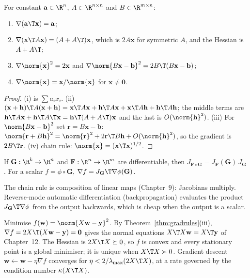 \begin{theorem}\label{thm:gradrules}
For constant $\mathbf{a}\in\R^n$, $A\in\R^{n\times n}$ and $B\in\R^{m\times n}$:
\begin{enumerate}[label=(\roman*)]
  \item $\nabla(\mathbf{a}\T\mathbf{x})=\mathbf{a}$;
  \item $\nabla(\mathbf{x}\T A\mathbf{x})=(A+A\T)\mathbf{x}$, which is $2A\mathbf{x}$ for symmetric $A$, and the Hessian is $A+A\T$;
  \item $\nabla\norm{\mathbf{x}}^2=2\mathbf{x}$ and $\nabla\norm{B\mathbf{x}-\mathbf{b}}^2=2B\T(B\mathbf{x}-\mathbf{b})$;
  \item $\nabla\norm{\mathbf{x}}=\mathbf{x}/\norm{\mathbf{x}}$ for $\mathbf{x}\ne\mathbf{0}$.
\end{enumerate}
\end{theorem}

\begin{proof}
(i) is $\sum a_ix_i$. (ii) $(\mathbf{x}+\mathbf{h})\T A(\mathbf{x}+\mathbf{h})=\mathbf{x}\T A\mathbf{x}+\mathbf{h}\T A\mathbf{x}+\mathbf{x}\T A\mathbf{h}+\mathbf{h}\T A\mathbf{h}$; the middle terms are $\mathbf{h}\T A\mathbf{x}+\mathbf{h}\T A\T\mathbf{x}=\mathbf{h}\T(A+A\T)\mathbf{x}$ and the last is $O(\norm{\mathbf{h}}^2)$. (iii) For $\norm{B\mathbf{x}-\mathbf{b}}^2$ set $\mathbf{r}=B\mathbf{x}-\mathbf{b}$: $\norm{\mathbf{r}+B\mathbf{h}}^2=\norm{\mathbf{r}}^2+2\mathbf{r}\T B\mathbf{h}+O(\norm{\mathbf{h}}^2)$, so the gradient is $2B\T\mathbf{r}$. (iv) chain rule: $\norm{\mathbf{x}}=(\mathbf{x}\T\mathbf{x})^{1/2}$.
\end{proof}

\begin{theorem}\label{thm:chainrule}
If $\mathbf{G}:\R^k\to\R^n$ and $\mathbf{F}:\R^n\to\R^m$ are differentiable, then $J_{\mathbf{F}\circ\mathbf{G}}=J_{\mathbf{F}}(\mathbf{G})\,J_{\mathbf{G}}$. For a scalar $f=\phi\circ\mathbf{G}$, $\nabla f=J_{\mathbf{G}}\T\nabla\phi(\mathbf{G})$.
\end{theorem}

The chain rule is composition of linear maps (Chapter~9): Jacobians multiply. Reverse-mode automatic differentiation (backpropagation) evaluates the product $J_{\mathbf{G}}\T\nabla\phi$ from the output backwards, which is cheap when the output is a scalar.

\begin{example}\label{ex:lscalc}
Minimise $f(\mathbf{w})=\norm{X\mathbf{w}-\mathbf{y}}^2$. By Theorem~\ref{thm:gradrules}(iii), $\nabla f=2X\T(X\mathbf{w}-\mathbf{y})=\mathbf{0}$ gives the normal equations $X\T X\mathbf{w}=X\T\mathbf{y}$ of Chapter~12. The Hessian is $2X\T X\succeq0$, so $f$ is convex and every stationary point is a global minimiser; it is unique when $X\T X\succ0$. Gradient descent $\mathbf{w}\leftarrow\mathbf{w}-\eta\nabla f$ converges for $\eta<2/\lambda_{\max}(2X\T X)$, at a rate governed by the condition number $\kappa(X\T X)$.
\end{example}


